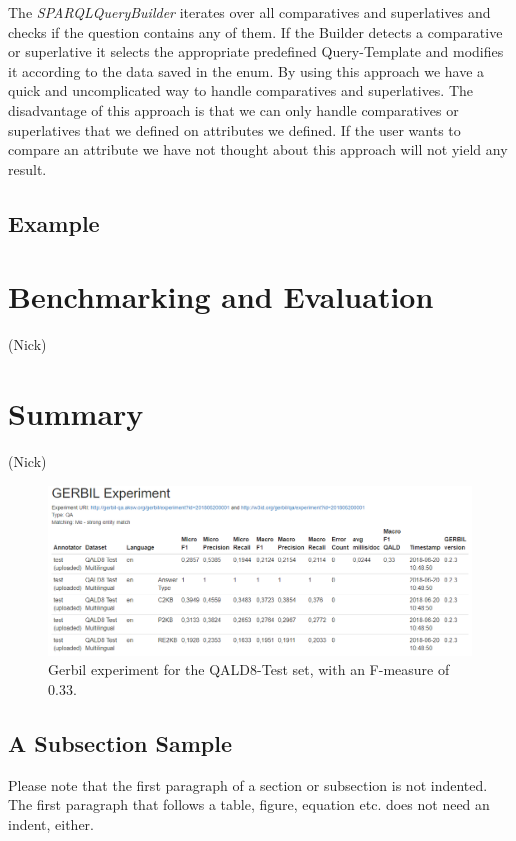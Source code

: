 \documentclass[runningheads]{llncs}
\begin{document}
The \emph{SPARQLQueryBuilder} iterates over all comparatives and superlatives and checks if the question contains any of them. If the Builder detects a comparative or superlative it selects the appropriate predefined Query-Template and modifies it according to the data saved in the enum. By using this approach we have a quick and uncomplicated way to handle comparatives and superlatives. The disadvantage of this approach is that we can only handle comparatives or superlatives that we defined on attributes we defined. If the user wants to compare an attribute we have not thought about this approach will not yield any result.



\subsection{Example}

\section{Benchmarking and Evaluation} (Nick)

\section{Summary} (Nick)

\begin{figure}
	\includegraphics[width=\textwidth]{QALD-8-Test.PNG}
	
	\caption{Gerbil experiment for the QALD8-Test set, with an F-measure of 0.33.}
	 \label{fig2} 
\end{figure}

\subsection{A Subsection Sample}
Please note that the first paragraph of a section or subsection is
not indented. The first paragraph that follows a table, figure,
equation etc. does not need an indent, either.
\end{document}
